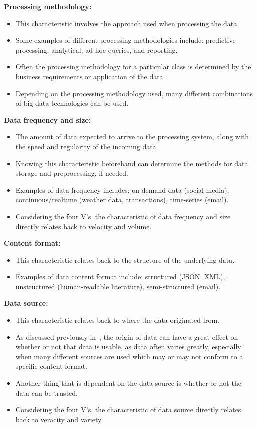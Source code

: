 \documentclass[a4paper,11pt]{article}
\begin{document}
\textbf{Processing methodology:}

\begin{itemize}
  \item This characteristic involves the approach used when processing the data.
  \item Some examples of different processing methodologies include: predictive processing, analytical, ad-hoc queries,
  and reporting.
  \item Often the processing methodology for a particular class is determined by the business requirements or application
  of the data.
  \item Depending on the processing methodology used, many different combinations of big data technologies can be used.
\end{itemize}

\textbf{Data frequency and size:}

\begin{itemize}
  \item The amount of data expected to arrive to the processing system, along with the speed and regularity of the incoming data.
  \item Knowing this characteristic beforehand can determine the methods for data storage and preprocessing, if needed.
  \item Examples of data frequency includes: on-demand data (social media), continuous/realtime (weather data, transactions),
  time-series (email).
  \item Considering the four V's, the characteristic of data frequency and size directly relates back to velocity and volume.
\end{itemize}

\textbf{Content format:}

\begin{itemize}
  \item This characteristic relates back to the structure of the underlying data.
  \item Examples of data content format include: structured (JSON, XML), unstructured (human-readable literature),
  semi-structured (email).
\end{itemize}

\textbf{Data source:}

\begin{itemize}
  \item This characteristic relates back to where the data originated from.
  \item As discussed previously in~, the origin of data can have a great effect on whether or not
  that data is usable, as data often varies greatly, especially when many different sources are used which may or may
  not conform to a specific content format.
  \item Another thing that is dependent on the data source is whether or not the data can be trusted.
  \item Considering the four V's, the characteristic of data source directly relates back to veracity and variety.
\end{itemize}
\end{document}
